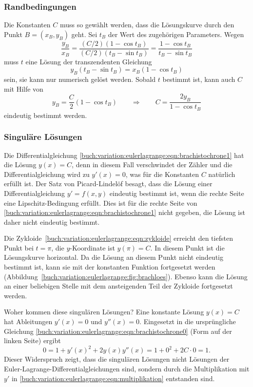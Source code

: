%
%
\subsubsection{Randbedingungen}
Die Konstanten $C$ muss so gewählt werden, dass die Lösungskurve
durch den Punkt $B=(x_B,y_B)$ geht. 
Sei $t_B$ der Wert des zugehörigen Parameters.
Wegen
\[
\frac{y_B}{x_B}
=
\frac{(C/2)(1-\cos t_B)}{(C/2)(t_B-\sin t_B)}
=
\frac{1-\cos t_B}{t_B-\sin t_B}
\]
muss $t$ eine Lösung der transzendenten Gleichung
\[
y_B(t_B-\sin t_B)=x_B(1-\cos t_B)
\]
sein, sie kann nur numerisch gelöst werden.
Sobald $t$ bestimmt ist, kann auch $C$ mit Hilfe von
\[
y_B = \frac{C}2(1-\cos t_B)
\qquad\Rightarrow\qquad
C
=
\frac{2y_B}{1-\cos t_B}
\]
eindeutig bestimmt werden.

%
%
\subsubsection{Singuläre Lösungen}

Die Differentialgleichung
\eqref{buch:variation:eulerlagrange:eqn:brachistochrone1}
hat die Lösung $y(x)=C$, denn in diesem Fall verschwindet
der Zähler und die Differentialgleichung wird zu $y'(x)=0$,
was für die Konstanten $C$ natürlich erfüllt ist.
Der Satz von Picard-Lindelöf besagt, dass die Lösung einer
Differentialgleichung $y'=f(x,y)$ eindeutig bestimmt ist, wenn die rechte
Seite eine Lipschitz-Bedingung erfüllt.
Dies ist für die rechte Seite von
\eqref{buch:variation:eulerlagrange:eqn:brachistochrone1}
nicht gegeben, die Lösung ist daher nicht eindeutig bestimmt.

Die Zykloide~\eqref{buch:variation:eulerlagrange:eqn:zykloide}
erreicht den tiefsten Punkt bei $t=\pi$, die $y$-Koordinate ist
$y(\pi)=C$.
In diesem Punkt ist die Lösungskurve horizontal.
Da die Lösung an diesem Punkt nicht eindeutig bestimmt ist,
kann sie mit der konstanten Funktion fortgesetzt werden
(Abbildung~\ref{buch:variation:eulerlagrange:fig:brachloes}).
Ebenso kann die Lösung an einer beliebigen Stelle mit dem ansteigenden
Teil der Zykloide fortgesetzt werden.

Woher kommen diese singulären Lösungen?
Eine konstante Lösung $y(x)=C$ hat Ableitungen
$y'(x)=0$ und $y''(x)=0$.
Eingesetzt in die ursprüngliche Gleichung
\eqref{buch:variation:eulerlagrange:eqn:brachistochrone0}
(Form auf der linken Seite) ergibt
\[
0
=
1+y'(x)^2+2y(x)y''(x)
=
1 + 0^2 + 2C\cdot 0
=
1.
\]
Dieser Widerspruch zeigt, dass die singulären Lösungen nicht
Lösungen der Euler-La\-gran\-ge-Differentialgleichungen sind, sondern
durch die Multiplikation mit $y'$ in
\eqref{buch:variation:eulerlagrange:eqn:multiplikation}
entstanden sind.


